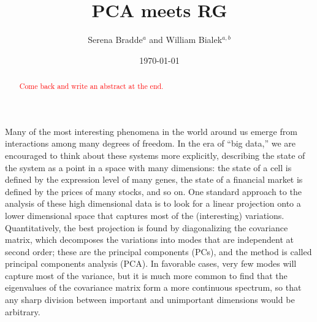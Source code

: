 \documentclass[aps,twocolumn,floats,nofootinbib,prl]{revtex4}
\begin{document}
\title{PCA meets RG}

\author{Serena Bradde$^a$ and William Bialek$^{a,b}$}


\date{\today}

\begin{abstract}
\textcolor{red}{Come back and write an abstract at the end.}
\end{abstract}

\maketitle

Many of the most interesting phenomena in the world around us emerge from interactions among many degrees of freedom.  In the era of ``big data,'' we are encouraged to think about these systems more explicitly, describing the state of the system as a point in a space with many dimensions:  the state of a cell is defined by the expression level of many genes, the state of a financial market is defined by the prices of many stocks, and so on.  One standard approach to the analysis of these high dimensional data is to look for a linear projection onto a lower dimensional space that captures most of the (interesting) variations.  Quantitatively, the best projection is found by diagonalizing the covariance matrix, which decomposes the variations into modes that are independent at second order; these are the principal components (PCs), and the method is called principal components analysis (PCA).  In favorable cases, very few modes will capture most of the variance, but it is much more common to find that the eigenvalues of the covariance matrix form a more continuous spectrum, so that any sharp  division between important and unimportant dimensions would be arbitrary. 

\end{document}
